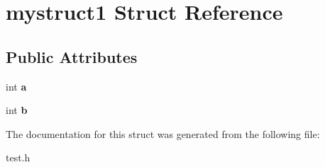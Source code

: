\hypertarget{structmystruct1}{}\section{mystruct1 Struct Reference}
\label{structmystruct1}
\subsection*{Public Attributes}
\begin{DoxyCompactItemize}
\item 
int {\bfseries a}\hypertarget{structmystruct1_a8173a6b04075966fd00909f1c2270392}{}\label{structmystruct1_a8173a6b04075966fd00909f1c2270392}

\item 
int {\bfseries b}\hypertarget{structmystruct1_a83eedc4a23c8c89697f86960aeee150f}{}\label{structmystruct1_a83eedc4a23c8c89697f86960aeee150f}

\end{DoxyCompactItemize}


The documentation for this struct was generated from the following file\+:\begin{DoxyCompactItemize}
\item 
test.\+h\end{DoxyCompactItemize}
